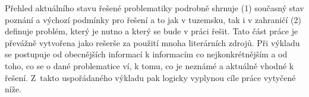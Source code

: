 Přehled aktuálního stavu řešené problematiky podrobně shrnuje (1) současný stav poznání a výchozí podmínky pro řešení a to jak v tuzemsku, tak i v zahraničí (2) definuje problém, který je nutno a který se bude v práci řešit. 
Tato část práce je převážně vytvořena jako rešerše za použití mnoha literárních zdrojů. 
Při výkladu se postupuje od obecnějších informací k informacím co nejkonkrétnějším a od toho, co se o dané problematice ví, k tomu, co je neznámé a aktuálně vhodné k řešení.
Z~takto uspořádaného výkladu pak logicky vyplynou cíle práce vytyčené níže.